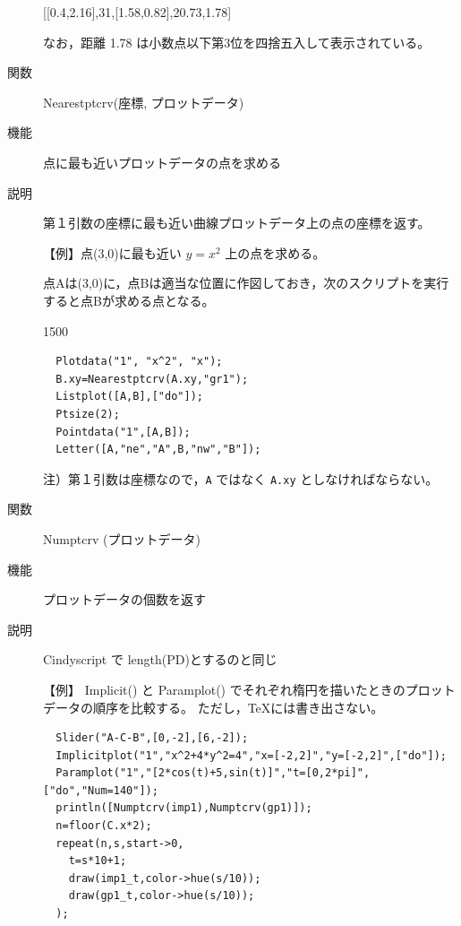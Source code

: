 \documentclass[papersize,a4paper,12pt,uplatex]{jsarticle}
\begin{document}
\begin{description}
\hspace{10mm}    [[0.4,2.16],31,[1.58,0.82],20.73,1.78] 

なお，距離 1.78 は小数点以下第3位を四捨五入して表示されている。

\vspace{\baselineskip}
\hypertarget{nearestptcrv}{}
\item[関数]  Nearestptcrv(座標, プロットデータ)
\item[機能]  点に最も近いプロットデータの点を求める
\item[説明]  第１引数の座標に最も近い曲線プロットデータ上の点の座標を返す。

\vspace{\baselineskip}
【例】点(3,0)に最も近い $y=x^2$ 上の点を求める。

点Aは(3,0)に，点Bは適当な位置に作図しておき，次のスクリプトを実行すると点Bが求める点となる。

\begin{layer}{150}{0}
\end{layer}

\begin{verbatim}
  Plotdata("1", "x^2", "x");
  B.xy=Nearestptcrv(A.xy,"gr1");
  Listplot([A,B],["do"]);
  Ptsize(2);
  Pointdata("1",[A,B]);
  Letter([A,"ne","A",B,"nw","B"]);
\end{verbatim}

注）第１引数は座標なので，\verb|A| ではなく \verb|A.xy| としなければならない。

\vspace{\baselineskip}
\hypertarget{numptcrv}{}
\item[関数]  Numptcrv (プロットデータ)
\item[機能]  プロットデータの個数を返す
\item[説明]  Cindyscript で length(PD)とするのと同じ

\vspace{\baselineskip}
【例】 Implicit() と Paramplot() でそれぞれ楕円を描いたときのプロットデータの順序を比較する。
  ただし，TeXには書き出さない。

\begin{verbatim}
  Slider("A-C-B",[0,-2],[6,-2]);
  Implicitplot("1","x^2+4*y^2=4","x=[-2,2]","y=[-2,2]",["do"]);
  Paramplot("1","[2*cos(t)+5,sin(t)]","t=[0,2*pi]",["do","Num=140"]);
  println([Numptcrv(imp1),Numptcrv(gp1)]);
  n=floor(C.x*2);
  repeat(n,s,start->0,
    t=s*10+1;
    draw(imp1_t,color->hue(s/10));
    draw(gp1_t,color->hue(s/10));
  );
\end{verbatim}


\end{description}
\end{document}
